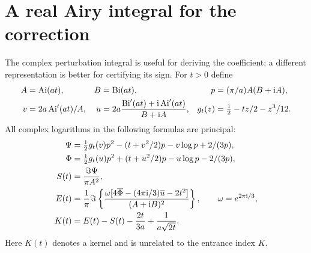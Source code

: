 \documentclass[11pt]{article}
\theoremstyle{remark}\newtheorem{remark}[theorem]{Remark}
\newcommand{\Ai}{\operatorname{Ai}}
\newcommand{\Bi}{\operatorname{Bi}}
\newcommand{\ii}{\mathrm i}
\begin{document}
\section{A real Airy integral for the correction}\label{xtw:frac:sec:signreduction}
The complex perturbation integral is useful for deriving the coefficient;
a different representation is better for certifying its sign.
For $t>0$ define
\begin{align}
 A&=\Ai(at),&B&=\Bi(at),&p&=(\pi/a)A(B+\ii A),\notag\\
 v&=2a\Ai'(at)/A,&
 u&=2a\frac{\Bi'(at)+\ii\Ai'(at)}{B+\ii A},&
 g_t(z)&=\tfrac12-tz/2-z^3/12.\label{xtw:frac:eq:realdefinitions}
\end{align}
All complex logarithms in the following formulas are principal:
\begin{align}
 \Psi&=\tfrac12g_t(v)p^2-(t+v^2/2)p-v\log p+2/(3p),\notag\\
 \Phi&=\tfrac12g_t(u)p^2+(t+u^2/2)p-u\log p-2/(3p),\label{xtw:frac:eq:psiphi}\\
 S(t)&=\frac{\Im\Psi}{\pi A^2},\notag\\
 E(t)&=\frac1\pi\Im\left\{
 \frac{\omega[4\overline\Phi-(4\pi\ii/3)\overline u-2t^2]}{(A+\ii B)^2}
                      \right\},\qquad \omega=e^{2\pi\ii/3},\notag\\
 K(t)&=E(t)-S(t)-\frac{2t}{3a}+\frac1{a\sqrt{2t}}.\label{xtw:frac:eq:realkernel}
\end{align}
Here $K(t)$ denotes a kernel and is unrelated to the entrance index $K$.
\end{document}
